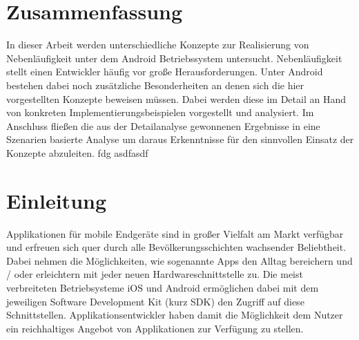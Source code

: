 \documentclass[12pt,oneside,a4paper,bibtotoc,liststotoc]{scrreprt}
\begin{document}
\onehalfspacing %

\chapter*{Zusammenfassung}
In dieser Arbeit werden unterschiedliche Konzepte zur Realisierung von Nebenläufigkeit unter dem Android Betriebssystem untersucht. Nebenläufigkeit stellt einen Entwickler häufig vor große Herausforderungen. Unter Android bestehen dabei noch zusätzliche Besonderheiten an denen sich die hier vorgestellten Konzepte beweisen müssen. Dabei werden diese im Detail an Hand von konkreten Implementierungsbeispielen vorgestellt und analysiert. Im Anschluss fließen die aus der Detailanalyse gewonnenen Ergebnisse in eine Szenarien basierte Analyse um daraus Erkenntnisse für den sinnvollen Einsatz der Konzepte abzuleiten.
fdg \newline
asdfasdf

\tableofcontents
\listoffigures


\chapter{Einleitung}
Applikationen für mobile Endgeräte sind in großer Vielfalt am Markt verfügbar und erfreuen sich quer durch alle Bevölkerungsschichten wachsender Beliebtheit. Dabei nehmen die Möglichkeiten, wie sogenannte Apps den Alltag bereichern und / oder erleichtern mit jeder neuen Hardwareschnittstelle zu. Die meist verbreiteten Betriebsysteme iOS und Android ermöglichen dabei mit dem jeweiligen Software Development Kit (kurz SDK) den Zugriff auf diese Schnittstellen. Applikationsentwickler haben damit die Möglichkeit dem Nutzer ein reichhaltiges Angebot von Applikationen zur Verfügung zu stellen.
\end{document}
